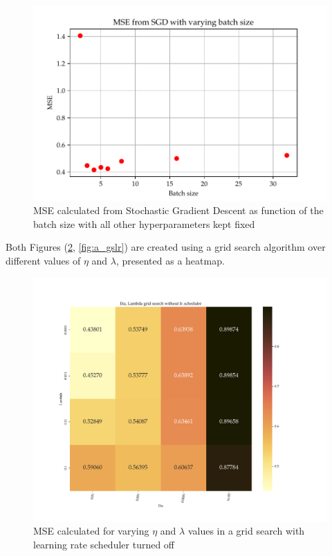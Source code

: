 \documentclass
[twocolumn,
secnumarabic,
nobibnotes,
aps,
prl,
reprint,
groupedaddress,
amsmath,
amssymb
]{revtex4-2}
\begin{document}
\begin{figure}
  \includegraphics[width=\columnwidth]{figures/EX_A_mse_with_varying_batch_size.pdf}
  \caption{\label{fig:a_bs}MSE calculated from Stochastic Gradient Descent as function of the batch size with all other hyperparameters kept fixed}
\end{figure}

Both Figures (\ref{fig:a_gs}, \ref{fig:a_gslr}) are created using a grid search algorithm over different values of $\eta$ and $\lambda$, presented as a heatmap.

\begin{figure}
  \includegraphics[width=\textwidth]{figures/EX_A__gridsearch.pdf}
  \caption{\label{fig:a_gs}MSE calculated for varying $\eta$ and $\lambda$ values in a grid search with learning rate scheduler turned off}
\end{figure}
\end{document}
